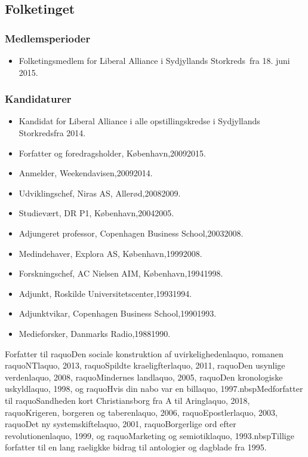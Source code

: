 \documentclass[11pt, a4paper]{awesome-cv}
\begin{document}
\begin{cvletter}
\subsection*{Folketinget}
\subsubsection*{Medlemsperioder}
\begin{itemize}
\item Folketingsmedlem for Liberal Alliance i Sydjyllands Storkreds fra 18. juni 2015.
\end{itemize}
\subsubsection*{Kandidaturer}
\begin{itemize}
\item Kandidat for Liberal Alliance i alle opstillingskredse i Sydjyllands Storkredsfra 2014.
\end{itemize}
\begin{itemize}
\item Forfatter og foredragsholder, København,20092015.
\item Anmelder, Weekendavisen,20092014.
\item Udviklingschef, Niras AS, Allerød,20082009.
\item Studievært, DR P1, København,20042005.
\item Adjungeret professor, Copenhagen Business School,20032008.
\item Medindehaver, Explora AS, København,19992008.
\item Forskningschef, AC Nielsen AIM, København,19941998.
\item Adjunkt, Roskilde Universitetscenter,19931994.
\item Adjunktvikar, Copenhagen Business School,19901993.
\item Medieforsker, Danmarks Radio,19881990.
\end{itemize}
Forfatter til raquoDen sociale konstruktion af uvirkelighedenlaquo, romanen raquoNTlaquo, 2013, raquoSpildte kraeligfterlaquo, 2011, raquoDen usynlige verdenlaquo, 2008, raquoMindernes landlaquo, 2005, raquoDen kronologiske uskyldlaquo, 1998, og raquoHvis din nabo var en billaquo, 1997.nbspMedforfatter til raquoSandheden kort  Christiansborg fra A til Aringlaquo, 2018, raquoKrigeren, borgeren og taberenlaquo, 2006, raquoEpostlerlaquo, 2003, raquoDet ny systemskiftelaquo, 2001, raquoBorgerlige ord efter revolutionenlaquo, 1999, og raquoMarketing og semiotiklaquo, 1993.nbspTillige forfatter til en lang raeligkke bidrag til antologier og dagblade fra 1995.

\end{cvletter}
\end{document}
